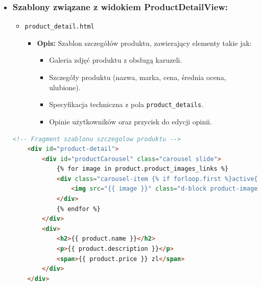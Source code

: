 \documentclass[12pt,a4paper,oneside]{article}
\theoremstyle{definition}
\numberwithin{equation}{section}
\begin{document}
\begin{itemize}
    \item \subsubsection{Szablony związane z widokiem ProductDetailView:}
        \begin{itemize}
            \item \texttt{product\_detail.html}
                \begin{itemize}
                    \item \textbf{Opis:} Szablon szczegółów produktu, zawierający elementy takie jak:
                    \begin{itemize}
                        \item Galeria zdjęć produktu z obsługą karuzeli.
                        \item Szczegóły produktu (nazwa, marka, cena, średnia ocena, ulubione).
                        \item Specyfikacja techniczna z pola \texttt{product\_details}.
                        \item Opinie użytkowników oraz przycisk do edycji opinii.
                    \end{itemize}
                \end{itemize}
        \end{itemize}
        \begin{lstlisting}[language=HTML, caption=Szablon product\_detail.html]
    <!-- Fragment szablonu szczegolow produktu -->
    <div id="product-detail">
        <div id="productCarousel" class="carousel slide">
            {% for image in product.product_images_links %}
            <div class="carousel-item {% if forloop.first %}active{% endif %}">
                <img src="{{ image }}" class="d-block product-image">
            </div>
            {% endfor %}
        </div>
        <div>
            <h2>{{ product.name }}</h2>
            <p>{{ product.description }}</p>
            <span>{{ product.price }} zl</span>
        </div>
    </div>
        \end{lstlisting}



\end{itemize}
\end{document}
